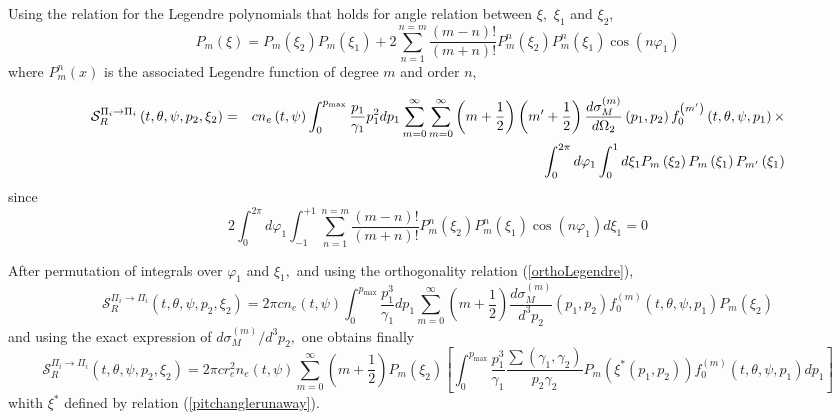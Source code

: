 Using the relation for the Legendre polynomials that holds for angle
relation between $\xi ,$ $\xi _{1}$ and $\xi _{2}$, 
\begin{equation}
P_{m}\left( \xi \right) =P_{m}\left( \xi _{2}\right) P_{m}\left( \xi
_{1}\right) +2\sum_{n=1}^{n=m}\frac{\left( m-n\right) !}{\left( m+n\right) !}%
P_{m}^{n}\left( \xi _{2}\right) P_{m}^{n}\left( \xi _{1}\right) \cos \left(
n\varphi _{1}\right)
\end{equation}
where $P_{m}^{n}\left( x\right) $ is the associated Legendre function of
degree $m$ and order $n$,

\begin{eqnarray}
\mathcal{S}_{R}^{\Pi _{i}\rightarrow \Pi _{i}}\left( t,\theta ,\psi
,p_{2},\xi _{2}\right) &=&cn_{e}\left( t,\psi \right) \int_{0}^{p_{\max }}%
\frac{p_{1}}{\gamma _{1}}p_{1}^{2}dp_{1}\sum_{m=0}^{\infty
}\sum_{m=0}^{\infty }\left( m+\frac{1}{2}\right) \left( m^{\prime }+\frac{1}{%
2}\right) \frac{d\sigma _{M}^{\left( m\right) }}{d\Omega _{2}}\left(
p_{1},p_{2}\right) f_{0}^{\left( m^{\prime }\right) }\left( t,\theta ,\psi
,p_{1}\right) \times  \notag \\
&&\int_{0}^{2\pi }d\varphi _{1}\int_{0}^{1}d\xi _{1}P_{m}\left( \xi
_{2}\right) P_{m}\left( \xi _{1}\right) P_{m^{\prime }}\left( \xi _{1}\right)
\end{eqnarray}%
since 
\begin{equation}
2\int_{0}^{2\pi }d\varphi _{1}\int_{-1}^{+1}\sum_{n=1}^{n=m}\frac{\left(
m-n\right) !}{\left( m+n\right) !}P_{m}^{n}\left( \xi _{2}\right)
P_{m}^{n}\left( \xi _{1}\right) \cos \left( n\varphi _{1}\right) d\xi _{1}=0
\end{equation}

After permutation of integrals over $\varphi _{1}$ and $\xi _{1},$ and using
the orthogonality relation (\ref{orthoLegendre}), 
\begin{equation}
\mathcal{S}_{R}^{\Pi _{i}\rightarrow \Pi _{i}}\left( t,\theta ,\psi
,p_{2},\xi _{2}\right) =2\pi cn_{e}\left( t,\psi \right) \int_{0}^{p_{\max }}%
\frac{p_{1}^{3}}{\gamma _{1}}dp_{1}\sum_{m=0}^{\infty }\left( m+\frac{1}{2}%
\right) \frac{d\sigma _{M}^{\left( m\right) }}{d^{3}p_{2}}\left(
p_{1},p_{2}\right) f_{0}^{\left( m\right) }\left( t,\theta ,\psi
,p_{1}\right) P_{m}\left( \xi _{2}\right) 
\end{equation}%
and using the exact expression of $d\sigma _{M}^{\left( m\right)
}/d^{3}p_{2},$ one obtains finally 
\begin{equation}
\mathcal{S}_{R}^{\Pi _{i}\rightarrow \Pi _{i}}\left( t,\theta ,\psi
,p_{2},\xi _{2}\right) =2\pi cr_{e}^{2}n_{e}\left( t,\psi \right)
\sum_{m=0}^{\infty }\left( m+\frac{1}{2}\right) P_{m}\left( \xi _{2}\right) %
\left[ \int_{0}^{p_{\max }}\frac{p_{1}^{3}}{\gamma _{1}}\frac{\sum \left(
\gamma _{1},\gamma _{2}\right) }{p_{2}\gamma _{2}}P_{m}\left( \xi ^{\ast
}\left( p_{1},p_{2}\right) \right) f_{0}^{\left( m\right) }\left( t,\theta
,\psi ,p_{1}\right) dp_{1}\right] 
\end{equation}%
whith $\xi ^{\ast }$ defined by relation (\ref{pitchanglerunaway}).

